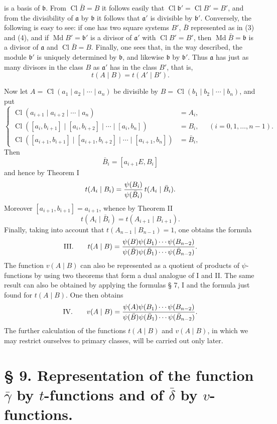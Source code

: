 \documentclass[11pt,a4paper]{article}
\newcommand{\Cl}{\operatorname{Cl}}
\newcommand{\Md}{\operatorname{Md}}
\begin{document}
is a basis of $\mathfrak b$. From $\Cl\bar B=B$ it follows easily that $\Cl\mathfrak b'=\Cl B'=B'$, and from the divisibility of $\mathfrak a$ by $\mathfrak b$ it follows that $\mathfrak a'$ is divisible by $\mathfrak b'$. Conversely, the following is easy to see: if one has two square systems $B'$, $\bar B$ represented as in (3) and (4), and if $\Md B'=\mathfrak b'$ is a divisor of $\mathfrak a'$ with $\Cl B'=B'$, then $\Md\bar B=\mathfrak b$ is a divisor of $\mathfrak a$ and $\Cl\bar B=B$. Finally, one sees that, in the way described, the module $\mathfrak b'$ is uniquely determined by $\mathfrak b$, and likewise $\mathfrak b$ by $\mathfrak b'$. Thus $\mathfrak a$ has just as many divisors in the class $B$ as $\mathfrak a'$ has in the class $B'$, that is,
\[
 t(A\mid B)=t(A'\mid B').
\]

Now let $A=\Cl(a_1\mid a_2\mid\cdots\mid a_n)$ be divisible by $B=\Cl(b_1\mid b_2\mid\cdots\mid b_n)$, and put
\begin{equation}
\left\{
\begin{aligned}
 \Cl(a_{i+1}\mid a_{i+2}\mid\cdots\mid a_n)&=A_i,\\
 \Cl([a_i,b_{i+1}]\mid[a_i,b_{i+2}]\mid\cdots\mid[a_i,b_n])&=B_i,\\
 \Cl([a_{i+1},b_{i+1}]\mid[a_{i+1},b_{i+2}]\mid\cdots\mid[a_{i+1},b_n])&=\bar B_i,
\end{aligned}
\right.
\quad (i=0,1,\ldots,n-1).
\tag{5}
\end{equation}
Then
\[
 \bar B_i=[a_{i+1}E,B_i]
\]
and hence by Theorem I
\[
 t(A_i\mid B_i)={\psi(B_i)\over\psi(\bar B_i)}\,t(A_i\mid\bar B_i).
\]
Moreover $[a_{i+1},b_{i+1}]=a_{i+1}$, whence by Theorem II
\[
 t(A_i\mid\bar B_i)=t(A_{i+1}\mid B_{i+1}).
\]
Finally, taking into account that $t(A_{n-1}\mid B_{n-1})=1$, one obtains the formula
\[
\text{III.}\qquad
 t(A\mid B)=
 {\psi(B)\psi(B_1)\cdots\psi(B_{n-2})
 \over
 \psi(\bar B)\psi(\bar B_1)\cdots\psi(\bar B_{n-2})}.
\]
The function $v(A\mid B)$ can also be represented as a quotient of products of $\psi$-functions by using two theorems that form a dual analogue of I and II. The same result can also be obtained by applying the formulas § 7, I and the formula just found for $t(A\mid B)$. One then obtains
\[
\text{IV.}\qquad
 v(A\mid B)=
 {\psi(A)\psi(B_1)\cdots\psi(B_{n-2})
 \over
 \psi(\bar B)\psi(\bar B_1)\cdots\psi(\bar B_{n-2})}.
\]
The further calculation of the functions $t(A\mid B)$ and $v(A\mid B)$, in which we may restrict ourselves to primary classes, will be carried out only later.

\section*{§ 9. Representation of the function $\bar\gamma$ by $t$-functions and of $\bar\delta$ by $v$-functions.}
\end{document}
